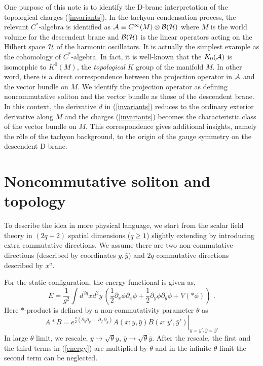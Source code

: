 \documentclass[a4paper,12pt]{article}
\begin{document}
One purpose of this note is to identify the
D-brane interpretation of the topological charges
(\ref{invariants}). In the tachyon condensation process,
the relevant $C^*$-algebra is identified as
${{\cal A}}\equiv C^\infty(M)\otimes {\cal B}({\cal H})$ where $M$ is the world
volume for the descendent brane and ${\cal B}({\cal H})$ is the
linear operators acting on the Hilbert space ${\cal H}$
of the harmonic oscillators. 
It is actually the simplest example as the cohomology
of $C^*$-algebra. In fact, it is well-known \cite{r:WO} that
the $K_0({\cal A})$ is isomorphic to
$K^0(M)$, the {\em topological} $K$  group of the manifold $M$.
In other word, there is a direct correspondence between
the projection operator in ${{\cal A}}$ and
the vector bundle on $M$. We identify the projection
operator as defining noncommutative soliton and
the vector bundle as those of the descendent brane.
In this context, the derivative $d$ in (\ref{invariants})
reduces to the ordinary exterior derivative along $M$ and the
charges (\ref{invariants}) becomes the characteristic
class of the vector bundle on $M$.
This correspondence gives additional
insights, namely the r\^ole of the tachyon background,
to the origin of the gauge symmetry on the descendent D-brane.


\section{Noncommutative soliton and topology}
To describe the idea in more physical language,
we start from the scalar field theory in 
$(2q+2)$ spatial dimensions
($q\geq1$) slightly extending \cite{r:GMS} by
introducing extra commutative directions.
We assume there are two non-commutative 
directions (described by coordinates $y,\bar y$)
and $2q$ commutative directions described by $x^a$.

For the static configuration, the energy functional is given as,
\begin{equation}\label{energy}
 E=\frac{1}{g^2}\int d^{2q} x  d^2 y\, 
(\frac{1}{2}\partial_x\phi\partial_x\phi +
\frac{1}{2}\partial_y\phi\partial_{\bar y}\phi + V(* \phi))\,\,.
\end{equation}
Here $*$-product is defined by a non-commutativity parameter
$\theta$ as
\begin{equation}\label{star-product}
 A * B = \left.e^{\frac{\theta}{2}(\partial_y\partial_{\bar{y}'}-\partial_{y'}
\partial_{\bar{y}})} A(x: y,\bar y) B(x:y',\bar y')
\right|_{y=y',\bar y=\bar y'}
\end{equation}
In large $\theta$ limit, we rescale, $
 y\rightarrow \sqrt{\theta}  y$,
$ \bar y\rightarrow \sqrt{\theta}  \bar y
$.  After the rescale, the first and the third terms
in (\ref{energy}) are multiplied by $\theta$
and in the infinite $\theta$ limit the second term 
can be neglected.
\end{document}
